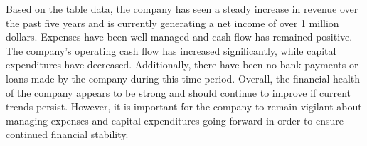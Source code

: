 

Based on the table data, the company has seen a steady increase in revenue over the past five years and is currently generating a net income of over 1 million dollars. Expenses have been well managed and cash flow has remained positive. The company's operating cash flow has increased significantly, while capital expenditures have decreased. Additionally, there have been no bank payments or loans made by the company during this time period. Overall, the financial health of the company appears to be strong and should continue to improve if current trends persist. However, it is important for the company to remain vigilant about managing expenses and capital expenditures going forward in order to ensure continued financial stability.